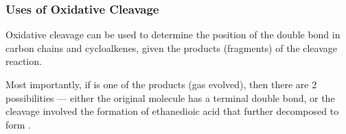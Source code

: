 
		\subsubsection{Uses of Oxidative Cleavage}

			Oxidative cleavage can be used to determine the position of the double bond in carbon chains and cycloalkenes,
			given the products (fragments) of the cleavage reaction.

			Most importantly, if  is one of the products (gas evolved), then there are 2 possibilities --- either the original
			molecule has a terminal  double bond, or the cleavage involved the formation of ethanedioic acid that further
			decomposed to form .






























